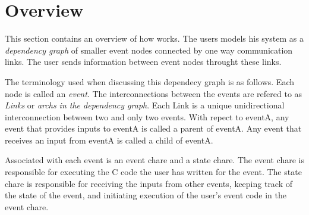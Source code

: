 \section{Overview}
\label{overview}

This section contains an overview of how \dispare works.  The users
models his system as a {\em dependency graph} of smaller event nodes
connected by one way communication links.  The user sends information
between event nodes throught these links.  

The terminology used when discussing this dependecy graph is as follows.
Each node is called an {\em event}.  The
interconnections between the events are refered to as {\em Links} or {\em
archs in the dependency graph}.
Each Link is a unique unidirectional interconnection between two and only two
events.  With repect to eventA, any event that provides inputs to eventA
is called a parent of eventA.  Any event that receives an input from
eventA is called a child of eventA.

Associated with each event is an event chare and a state chare.  The
event chare is responsible for executing the C code the user has written
for the event.  The state chare is responsible for receiving the inputs
from other events, keeping track of the state of the event, and
initiating execution of the user's event code in the event chare.


